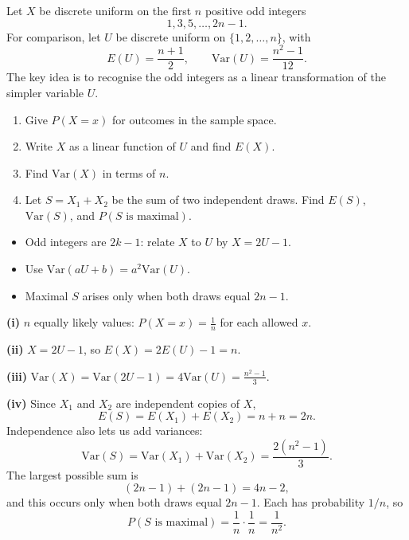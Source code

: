 
\begin{problem}
Let $X$ be discrete uniform on the first $n$ positive odd integers
\[
1,3,5,\ldots,2n-1.
\]
For comparison, let $U$ be discrete uniform on $\{1,2,\ldots,n\}$, with
\[
E(U)=\frac{n+1}{2},\qquad \mathrm{Var}(U)=\frac{n^2-1}{12}.
\]
The key idea is to recognise the odd integers as a linear transformation of the simpler variable $U$.
\begin{enumerate}[label=\textbf{(\roman*)}]
  \item Give $P(X=x)$ for outcomes in the sample space.
  \item Write $X$ as a linear function of $U$ and find $E(X)$.
  \item Find $\mathrm{Var}(X)$ in terms of $n$.
  \item Let $S=X_{1}+X_{2}$ be the sum of two independent draws. Find $E(S)$, $\mathrm{Var}(S)$, and $P(S\text{ is maximal})$.
\end{enumerate}
\end{problem}

\begin{hint}
\begin{itemize}[leftmargin=*]
  \item Odd integers are $2k-1$: relate $X$ to $U$ by $X=2U-1$.
  \item Use $\mathrm{Var}(aU+b)=a^{2}\mathrm{Var}(U)$.
  \item Maximal $S$ arises only when both draws equal $2n-1$.
\end{itemize}
\end{hint}

\begin{solution}
\textbf{(i)} $n$ equally likely values: $P(X=x)=\frac{1}{n}$ for each allowed $x$.

\textbf{(ii)} $X=2U-1$, so $E(X)=2E(U)-1=n$.

\textbf{(iii)} $\mathrm{Var}(X)=\mathrm{Var}(2U-1)=4\mathrm{Var}(U)=\frac{n^{2}-1}{3}$.

\textbf{(iv)} Since $X_1$ and $X_2$ are independent copies of $X$,
\[
E(S)=E(X_1)+E(X_2)=n+n=2n.
\]
Independence also lets us add variances:
\[
\mathrm{Var}(S)=\mathrm{Var}(X_1)+\mathrm{Var}(X_2)=\frac{2(n^2-1)}{3}.
\]
The largest possible sum is
\[
(2n-1)+(2n-1)=4n-2,
\]
and this occurs only when both draws equal $2n-1$. Each has probability $1/n$, so
\[
P(S\text{ is maximal})=\frac1n\cdot\frac1n=\frac{1}{n^2}.
\]
\end{solution}

